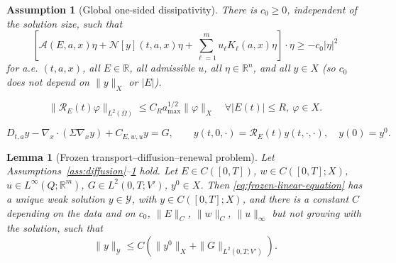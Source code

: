 \documentclass[10pt,a4paper]{amsart}
\newtheorem{assumption}{Assumption}
\newtheorem{lemma}{Lemma}
\newcommand{\R}{\mathbb R}
\begin{document}
\begin{assumption}[Global one-sided dissipativity]
\label{ass:dissipativity}
There is $c_0\ge0$, \emph{independent of the solution size}, such that
\begin{equation}
\label{eq:global-dissipativity}
\left[
\mathcal A(E,a,x)\eta
+
\mathcal N[y](t,a,x)\eta
+
\sum_{\ell=1}^m u_\ell K_\ell(a,x)\eta
\right]\cdot\eta
\ge
-c_0|\eta|^2
\end{equation}
for a.e. $(t,a,x)$, all $E\in\R$, all admissible $u$, all $\eta\in\R^n$, and
\emph{all} $y\in X$ (so $c_0$ does not depend on $\|y\|_X$ or $|E|$).
\end{assumption}

\begin{equation}
\label{eq:renewal-estimate}
\|\mathcal R_E(t)\varphi\|_{L^2(\Omega)}
\le
C_R a_{\max}^{1/2}\|\varphi\|_X
\quad
\forall |E(t)|\le R,\ \varphi\in X .
\end{equation}

\begin{equation}
\label{eq:frozen-linear-equation}
D_{t,a}y
-\nabla_x\cdot(\Sigma\nabla_x y)
+
C_{E,w,u}y
=
G,
\qquad
y(t,0,\cdot)=\mathcal R_E(t)y(t,\cdot,\cdot),
\quad
y(0)=y^0 .
\end{equation}

\begin{lemma}[Frozen transport--diffusion--renewal problem]
\label{lem:frozen-linear-wp}
Let Assumptions~\ref{ass:diffusion}--\ref{ass:dissipativity} hold.
Let $E\in C([0,T])$, $w\in C([0,T];X)$, $u\in L^\infty(Q;\R^m)$,
$G\in L^2(0,T;V')$, $y^0\in X$. Then \eqref{eq:frozen-linear-equation} has a
unique weak solution $y\in\mathcal Y$, with $y\in C([0,T];X)$, and there is a
constant $C$ depending on the data and on $c_0$, $\|E\|_{C}$, $\|w\|_C$,
$\|u\|_\infty$ but \emph{not growing with the solution}, such that
\begin{equation}
\label{eq:frozen-estimate}
\|y\|_{\mathcal Y}
\le
C
\left(
\|y^0\|_X
+
\|G\|_{L^2(0,T;V')}
\right).
\end{equation}
\end{lemma}
\end{document}
